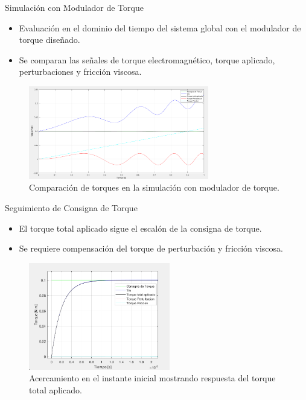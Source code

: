 \documentclass[12pt]{beamer}
\begin{document}
\begin{frame}{Simulación con Modulador de Torque}
    \begin{itemize}
        \item Evaluación en el dominio del tiempo del sistema global con el modulador de torque diseñado.
        \item Se comparan las señales de torque electromagnético, torque aplicado, perturbaciones y fricción viscosa.
    \end{itemize}
    \begin{figure}[H]
        \centering
        \includegraphics[width=0.7\textwidth]{Imagenes/Torques_simulacion_modulador_torque.png}
        \caption{Comparación de torques en la simulación con modulador de torque.}
        \label{fig:curvas_torques_modulador}
    \end{figure}
\end{frame}

\begin{frame}{Seguimiento de Consigna de Torque}
    \begin{itemize}
        \item El torque total aplicado sigue el escalón de la consigna de torque.
        \item Se requiere compensación del torque de perturbación y fricción viscosa.
    \end{itemize}
    \begin{figure}[H]
        \centering
        \includegraphics[width=0.55\textwidth]{Imagenes/Acercamiento_torques_modulador.png}
        \caption{Acercamiento en el instante inicial mostrando respuesta del torque total aplicado.}
        \label{fig:acercamiento_torques_modulador}
    \end{figure}
\end{frame}
\end{document}
